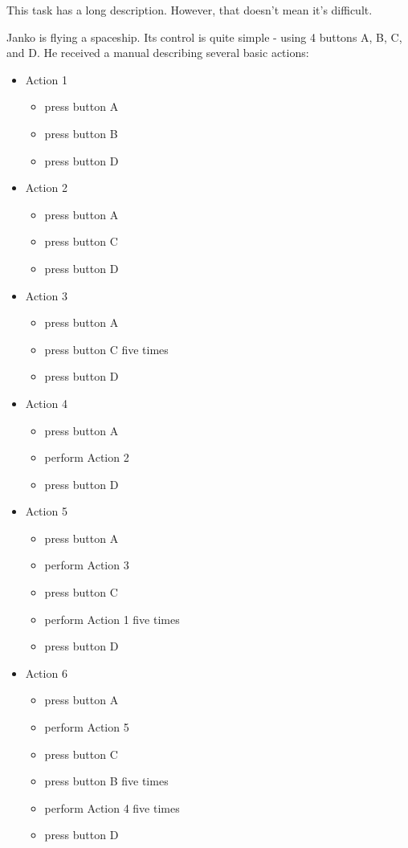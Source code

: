 




This task has a long description. However, that doesn't mean it's difficult.

Janko is flying a spaceship. Its control is quite simple - using 4 buttons A, B, C, and D. He received a manual describing several basic actions:

\begin{itemize}
	\item Action 1
	\begin{itemize}
		\item press button A
		\item press button B
		\item press button D
	\end{itemize}

	\item Action 2
	\begin{itemize}
		\item press button A
		\item press button C
		\item press button D
	\end{itemize}

	\item Action 3
	\begin{itemize}
		\item press button A
		\item press button C five times
		\item press button D
	\end{itemize}

	\item Action 4
	\begin{itemize}
		\item press button A
		\item perform Action 2
		\item press button D
	\end{itemize}

	\item Action 5
	\begin{itemize}
		\item press button A
		\item perform Action 3
		\item press button C
		\item perform Action 1 five times
		\item press button D
	\end{itemize}

	\item Action 6
	\begin{itemize}
		\item press button A
		\item perform Action 5
		\item press button C
		\item press button B five times
		\item perform Action 4 five times
		\item press button D
	\end{itemize}

\end{itemize}

